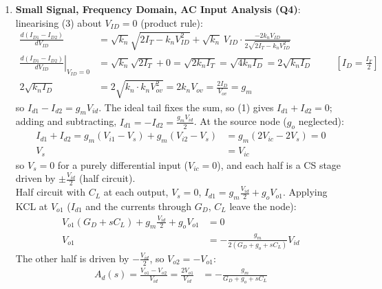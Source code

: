 \begin{enumerate}
\[      \hspace{1cm}
      I_{D2} = \frac{I_T}{2} - \frac{\sqrt{k_n}\, V_{ID}}{2}\sqrt{2 I_T - k_n V_{ID}^2}
    \]
    At the limit \(V_{ID}^2 = \frac{I_T}{k_n}\), (3) gives
    \(\sqrt{k_n}\sqrt{\frac{I_T}{k_n}}\sqrt{2 I_T - I_T} = I_T\), so \(I_{D1} = I_T\),
    \(I_{D2} = 0\). With \(V_{ov}\) the quiescent overdrive
    (\(V_{ID} = 0\): \(k_n V_{ov}^2 = \frac{I_T}{2}\), so \(\frac{I_T}{k_n} = 2 V_{ov}^2\)),
    the limit is \(|V_{ID}| = \sqrt{2 V_{ov}^2} = \sqrt{2}\, V_{ov}\). Beyond it one
    device is off and all of \(I_T\) flows in the other. The outputs are
    \(V_{O1,2} = V_{dd} - \frac{I_{D1,2}}{G_D}\) and the common mode \(V_{IC}\)
    appears nowhere in \(I_{D1} - I_{D2}\).
  \item \textbf{Small Signal, Frequency Domain, AC Input Analysis (Q4)}:
    linearising (3) about \(V_{ID} = 0\) (product rule):
    \begin{align*}
      \frac{d(I_{D1} - I_{D2})}{dV_{ID}} &= \sqrt{k_n}\sqrt{2 I_T - k_n V_{ID}^2} + \sqrt{k_n}\, V_{ID} \cdot \frac{-2 k_n V_{ID}}{2\sqrt{2 I_T - k_n V_{ID}^2}} \\
      \left.\frac{d(I_{D1} - I_{D2})}{dV_{ID}}\right|_{V_{ID} = 0} &= \sqrt{k_n}\sqrt{2 I_T} + 0 = \sqrt{2 k_n I_T} = \sqrt{4 k_n I_D} = 2\sqrt{k_n I_D} \hspace{1cm} [I_D = \tfrac{I_T}{2}] \\
      2\sqrt{k_n I_D} &= 2\sqrt{k_n \cdot k_n V_{ov}^2} = 2 k_n V_{ov} = \frac{2 I_D}{V_{ov}} = g_m
    \end{align*}
    so \(I_{d1} - I_{d2} = g_m V_{id}\). The ideal tail fixes the sum, so (1)
    gives \(I_{d1} + I_{d2} = 0\); adding and subtracting,
    \(I_{d1} = -I_{d2} = \frac{g_m V_{id}}{2}\). At the source node
    (\(g_o\) neglected):
    \begin{align*}
      I_{d1} + I_{d2} = g_m (V_{i1} - V_s) + g_m (V_{i2} - V_s) &= g_m (2 V_{ic} - 2 V_s) = 0 \\
      V_s &= V_{ic}
    \end{align*}
    so \(V_s = 0\) for a purely differential input (\(V_{ic} = 0\)), and each
    half is a CS stage driven by \(\pm\frac{V_{id}}{2}\) (half circuit).\\
    Half circuit with \(C_L\) at each output, \(V_s = 0\),
    \(I_{d1} = g_m \frac{V_{id}}{2} + g_o V_{o1}\). Applying KCL at \(V_{o1}\) (\(I_{d1}\) and the
    currents through \(G_D\), \(C_L\) leave the node):
    \begin{align*}
      V_{o1} (G_D + sC_L) + g_m \frac{V_{id}}{2} + g_o V_{o1} &= 0 \\
      V_{o1} &= -\frac{g_m}{2(G_D + g_o + sC_L)} V_{id} \tag{4}
    \end{align*}
    The other half is driven by \(-\frac{V_{id}}{2}\), so \(V_{o2} = -V_{o1}\):
    \begin{align*}
      A_d(s) = \frac{V_{o1} - V_{o2}}{V_{id}} = \frac{2 V_{o1}}{V_{id}} &= -\frac{g_m}{G_D + g_o + sC_L} \tag{5}
    \end{align*}
\end{enumerate}

